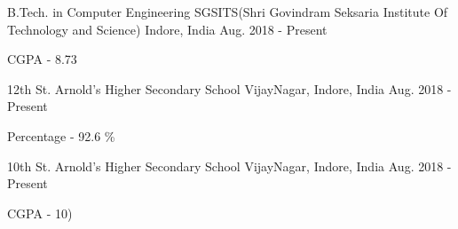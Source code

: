

\begin{cventries}

  \cventry
    {B.Tech. in Computer Engineering} %
    {SGSITS(Shri Govindram Seksaria Institute Of Technology and Science)} %
    {Indore, India} %
    {Aug. 2018 - Present} %
    {
      \begin{cvitems} %
        \item {CGPA - 8.73}
      \end{cvitems}
    }
    
  \cventry
    {12th} 
    {St. Arnold's Higher Secondary School} %
    {VijayNagar, Indore, India} %
    {Aug. 2018 - Present} %
    {
      \begin{cvitems} %
        \item {Percentage - 92.6 \%}
      \end{cvitems}
    }

  \cventry
    {10th} 
    {St. Arnold's Higher Secondary School} %
    {VijayNagar, Indore, India} %
    {Aug. 2018 - Present} %
    {
      \begin{cvitems} %
        \item {CGPA - 10)}
      \end{cvitems}
    }

\end{cventries}
